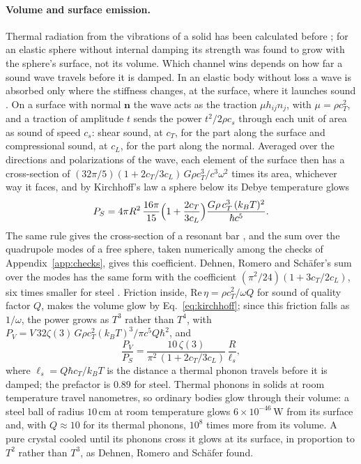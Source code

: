 \paragraph{Volume and surface emission.} Thermal radiation from the
vibrations of a solid has been calculated before
\cite{SchaeferDehnen1981,DehnenRomeroSchaefer1984};
for an elastic sphere without internal damping its strength was found to grow
with the sphere's surface, not its volume. Which channel wins depends on how
far a sound wave travels before it is damped. In an elastic body without
loss a wave is absorbed only where the stiffness changes, at the surface, where
it launches sound \cite{Dyson1969}. On a surface with normal $\mathbf n$ the
wave acts as the traction $\mu h_{ij}n_j$, with $\mu = \rho c_T^2$, and a
traction of amplitude $t$ sends the power $t^2/2\rho c_s$ through each unit of
area as sound of speed $c_s$: shear sound, at $c_T$, for the part along the
surface and compressional sound, at $c_L$, for the part along the normal.
Averaged over the directions and polarizations of the wave, each element of
the surface then has a cross-section of
$(32\pi/5)(1 + 2c_T/3c_L)\,G\rho c_T^3/c^3\omega^2$ times its area, whichever
way it faces, and by Kirchhoff's law a sphere below its Debye temperature glows
\begin{equation}\label{eq:surface-glow}
P_S = 4\pi R^2\,\frac{16\pi}{15}\Bigl(1 + \frac{2c_T}{3c_L}\Bigr)
\frac{G\rho\,c_T^3\,(k_BT)^2}{\hbar c^5} .
\end{equation}
The same rule gives the cross-section of a resonant bar
\cite{MisnerThorneWheeler1973}, and the sum over the quadrupole modes of a
free sphere, taken numerically among the checks of
Appendix~\ref{app:checks}, gives this coefficient. Dehnen, Romero
and Schäfer's sum over the modes has the same form with the coefficient
$(\pi^2/24)(1 + 3c_T/2c_L)$, six times smaller for steel
\cite{DehnenRomeroSchaefer1984}. Friction inside, $\mathrm{Re}\,\eta = \rho c_T^2/\omega Q$ for
sound of quality factor $Q$, makes the volume glow by Eq.~\eqref{eq:kirchhoff};
since this friction falls as $1/\omega$, the power grows as $T^3$ rather than
$T^4$, with $P_V = V\,32\zeta(3)\,G\rho c_T^2 (k_BT)^3/\pi c^5 Q\hbar^2$, and
\begin{equation}\label{eq:volume-surface}
\frac{P_V}{P_S} =\frac{10\,\zeta(3)}{\pi^2\,(1 + 2c_T/3c_L)}\,
\frac{R}{\ell_s} ,
\end{equation}
where $\ell_s = Q\hbar c_T/k_BT$ is the distance a thermal phonon travels
before it is damped; the prefactor is $0.89$ for steel. Thermal phonons in
solids at room temperature travel nanometres, so ordinary bodies glow through
their volume: a steel ball of radius $10\,\mathrm{cm}$ at room temperature
glows $6\times10^{-46}\,\mathrm{W}$ from its surface and, with $Q\approx10$ for its
thermal phonons, $10^{8}$ times more from its volume. A pure crystal cooled until
its phonons cross it glows at its surface, in proportion to $T^2$ rather than
$T^3$, as Dehnen, Romero and Schäfer found.
